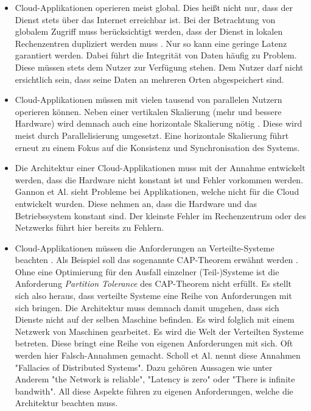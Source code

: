 \begin{itemize}
    \item Cloud-Applikationen operieren meist global. Dies heißt nicht nur, dass der Dienst stets über das Internet erreichbar ist. Bei der Betrachtung von globalem Zugriff muss berücksichtigt werden, dass der Dienst in lokalen Rechenzentren dupliziert werden muss \cite{gannon_cloud-native_2017}. Nur so kann eine geringe Latenz garantiert werden. Dabei führt die Integrität von Daten häufig zu Problem. Diese müssen stets dem Nutzer zur Verfügung stehen. Dem Nutzer darf nicht ersichtlich sein, dass seine Daten an mehreren Orten abgespeichert sind.  
    \item Cloud-Applikationen müssen mit vielen tausend von parallelen Nutzern operieren können. Neben einer vertikalen Skalierung (mehr und bessere Hardware) wird demnach auch eine horizontale Skalierung nötig \cite{gannon_cloud-native_2017}. Diese wird meist durch Parallelisierung umgesetzt. Eine horizontale Skalierung führt erneut zu einem Fokus auf die Konsistenz und Synchronisation des Systems. 
    \item Die Architektur einer Cloud-Applikationen muss mit der Annahme entwickelt werden, dass die Hardware nicht konstant ist und Fehler vorkommen werden. Gannon et Al. \cite{gannon_cloud-native_2017} sieht Probleme bei Applikationen, welche nicht für die Cloud entwickelt wurden. Diese nehmen an, dass die Hardware und das Betriebssystem konstant sind. Der kleinste Fehler im Rechenzentrum oder des Netzwerks führt hier bereits zu Fehlern. 
    \item Cloud-Applikationen müssen die Anforderungen an Verteilte-Systeme beachten \cite{scholl_cloud_2019}. Als Beispiel soll das sogenannte CAP-Theorem erwähnt werden \cite{julianbrowne_brewers_nodate}. Ohne eine Optimierung für den Ausfall einzelner (Teil-)Systeme ist die Anforderung \textit{Partition Tolerance} des CAP-Theorem nicht erfüllt. Es stellt sich also heraus, dass verteilte Systeme eine Reihe von Anforderungen mit sich bringen. Die Architektur muss demnach damit umgehen, dass sich Dienste nicht auf der selben Maschine befinden. Es wird folglich mit einem Netzwerk von Maschinen gearbeitet. Es wird die Welt der Verteilten Systeme betreten. Diese bringt eine Reihe von eigenen Anforderungen mit sich. Oft werden hier Falsch-Annahmen gemacht. Scholl et Al. \cite{scholl_cloud_2019} nennt diese Annahmen "Fallacies of Distributed Systems". Dazu gehören Aussagen wie unter Anderem "the Network is reliable", "Latency is zero" oder "There is infinite bandwith". All diese Aspekte führen zu eigenen Anforderungen, welche die Architektur beachten muss.

\end{itemize}

